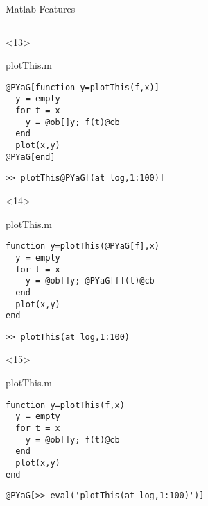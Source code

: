 \begin{frame}[fragile]{Matlab Features}
\begin{columns}
\begin{column}[T]{5cm}
      \begin{onlyenv}<13>
        \begin{block}{plotThis.m}
          \begin{Verbatim}[commandchars=@\[\]]
@PYaG[function y=plotThis(f,x)]
  y = empty
  for t = x
    y = @ob[]y; f(t)@cb
  end
  plot(x,y)
@PYaG[end]
          \end{Verbatim}
        \end{block}
          \begin{Verbatim}[commandchars=@\[\]]
>> plotThis@PYaG[(at log,1:100)]
        \end{Verbatim}
      \end{onlyenv}
      \begin{onlyenv}<14>
        \begin{block}{plotThis.m}
          \begin{Verbatim}[commandchars=@\[\]]
function y=plotThis(@PYaG[f],x)
  y = empty
  for t = x
    y = @ob[]y; @PYaG[f](t)@cb
  end
  plot(x,y)
end
          \end{Verbatim}
        \end{block}
          \begin{Verbatim}[commandchars=@\[\]]
>> plotThis(at log,1:100)
        \end{Verbatim}
      \end{onlyenv}


      \begin{onlyenv}<15>
        \begin{block}{plotThis.m}
          \begin{Verbatim}[commandchars=@\[\]]
function y=plotThis(f,x)
  y = empty
  for t = x
    y = @ob[]y; f(t)@cb
  end
  plot(x,y)
end
          \end{Verbatim}
        \end{block}
          \begin{Verbatim}[commandchars=@\[\]]
@PYaG[>> eval('plotThis(at log,1:100)')]
        \end{Verbatim}
      \end{onlyenv}

    \end{column}




\end{columns}
\end{frame}
